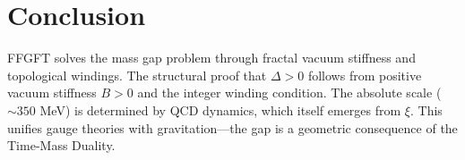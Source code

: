 	\section*{Conclusion}
	
	FFGFT solves the mass gap problem through fractal vacuum stiffness and topological windings. The structural proof that $\Delta > 0$ follows from positive vacuum stiffness $B > 0$ and the integer winding condition. The absolute scale ($\sim 350$ MeV) is determined by QCD dynamics, which itself emerges from $\xi$. This unifies gauge theories with gravitation---the gap is a geometric consequence of the Time-Mass Duality.



